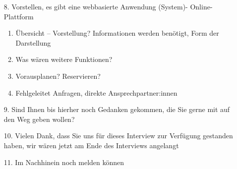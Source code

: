 {\sffamily\color{maincolor}{Abschnitt: Visionen und Ziele}}
\begin{enumerate}
    \item[8.] Vorstellen, es gibt eine webbasierte Anwendung (System)- Online-Plattform
        \begin{enumerate}
            \item Übersicht – Vorstellung?
                  Informationen werden benötigt,
                  Form der Darstellung
            \item Was wären weitere Funktionen?
            \item Vorausplanen? Reservieren?
            \item Fehlgeleitet Anfragen, direkte Ansprechpartner:innen
        \end{enumerate}
    \item[9.] Sind Ihnen bis hierher noch Gedanken gekommen, die Sie gerne mit auf den Weg geben wollen?
    \item[10.] Vielen Dank, dass Sie uns für dieses Interview zur Verfügung gestanden haben, wir wären jetzt am Ende des Interviews angelangt
    \item[11.] Im Nachhinein noch melden können
\end{enumerate}

